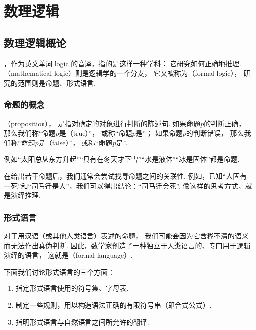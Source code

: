\chapter{数理逻辑}

\section{数理逻辑概论}
，作为英文单词 logic 的音译，指的是这样一种学科：
它研究如何正确地推理.
（mathematical logic）则是逻辑学的一个分支，
它又被称为（formal logic），
研究的范围则是命题、形式语言.

\subsection{命题的概念}
（proposition），
是指对确定的对象进行判断的陈述句.
如果命题\(p\)的判断正确，
那么我们称“命题\(p\)是（true）”，
或称“命题\(p\)是”；
如果命题\(p\)的判断错误，
那么我们称“命题\(p\)是（false）”，
或称“命题\(p\)是”.

例如“太阳总从东方升起”“只有在冬天才下雪”“水是液体”“冰是固体”都是命题.

在给出若干命题后，我们通常会尝试找寻命题之间的关联性.
例如，已知“人固有一死”和“司马迁是人”，我们可以得出结论：“司马迁会死”.
像这样的思考方式，就是演绎推理.

\subsection{形式语言}
对于用汉语（或其他人类语言）表述的命题，
我们可能会因为它含糊不清的语义而无法作出真伪判断.
因此，数学家创造了一种独立于人类语言的、专门用于逻辑演绎的语言，
这就是（formal language）.

下面我们讨论形式语言的三个方面：
\begin{enumerate}
	\item 指定形式语言使用的符号集、字母表.
	\item 制定一些规则，用以构造语法正确的有限符号串（即合式公式）.
	\item 指明形式语言与自然语言之间所允许的翻译.
\end{enumerate}


